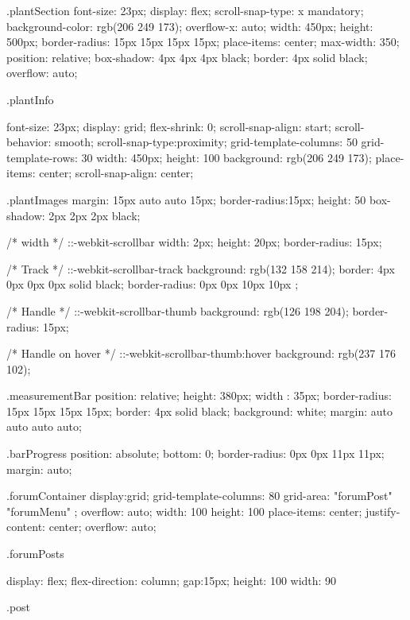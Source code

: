 \documentclass[12pt]{article} %
\begin{document}
\begin{htmlcode}[caption={CSS Stlye Sheet}]
{}

.plantSection
{
   font-size: 23px;
   display: flex;
   scroll-snap-type: x mandatory;
   background-color: rgb(206 249 173);
   overflow-x: auto;
   width: 450px;
   height: 500px;
   border-radius: 15px 15px 15px 15px;
   place-items: center;
   max-width: 350;
   position: relative;
   box-shadow: 4px 4px 4px black;
   border: 4px solid black;
   overflow: auto;
}



.plantInfo
{
   font-size: 23px;
   display: grid;
   flex-shrink: 0;
   scroll-snap-align: start;
   scroll-behavior: smooth;
   scroll-snap-type:proximity;
   grid-template-columns: 50%
   grid-template-rows: 30%
   width: 450px;
   height: 100%
   background: rgb(206 249 173);
   place-items: center;
   scroll-snap-align: center;
 

}

.plantImages
{
margin: 15px auto auto 15px;
border-radius:15px;
height: 50%
box-shadow: 2px 2px 2px black;
}

/* width */
::-webkit-scrollbar {
   width: 2px;
   height: 20px;
   border-radius: 15px;
 }
 
 /* Track */
 ::-webkit-scrollbar-track {
   background: rgb(132 158 214);
   border: 4px 0px 0px 0px solid black;
   border-radius: 0px 0px 10px 10px  ;
 }
 
 /* Handle */
 ::-webkit-scrollbar-thumb {
   background: rgb(126 198 204);
   border-radius: 15px;
}
 
 /* Handle on hover */
 ::-webkit-scrollbar-thumb:hover {
   background: rgb(237 176 102);
 }

.measurementBar
{
   position: relative;
   height: 380px;
   width : 35px;
   border-radius: 15px 15px 15px 15px;
   border: 4px solid black;
   background: white;
   margin: auto auto auto auto;
}

.barProgress {
   position: absolute; 
   bottom: 0; 
   border-radius: 0px 0px 11px 11px; 
   margin: auto; 
}


.forumContainer
{
   display:grid;
   grid-template-columns: 80%
   grid-area: 
   "forumPost" "forumMenu" ;
   overflow: auto;
   width: 100%
   height: 100%
   place-items: center;
   justify-content: center;
   overflow: auto;
}

.forumPosts
{
   display: flex;
   flex-direction: column;
   gap:15px;
   height: 100%
   width: 90%
  
}

.post
{

}
\end{htmlcode}
\end{document}
